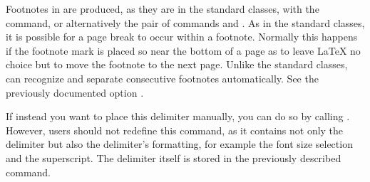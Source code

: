 \begin{Declaration}
\end{Declaration}%
Footnotes in \KOMAScript{} are produced, as they are in the standard classes,
with the  command, or alternatively the pair of commands
 and . As in the standard classes,
it is possible for a page break to occur within a footnote. Normally this
happens if the footnote mark is placed so near the bottom of a page as to
leave \LaTeX{} no choice but to move the footnote to the next page.
Unlike
the standard classes, \KOMAScript{} can recognize and separate consecutive
footnotes automatically. 
See the previously
documented option .

If instead you want to place this delimiter manually, you can do so by calling
. However, users should not redefine this
command, as it contains not only the delimiter but also the delimiter's
formatting, for example the font size selection and the superscript. The
delimiter itself is stored in the previously described
%
%
 command.

